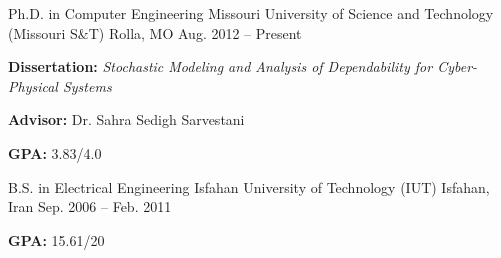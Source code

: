 \begin{cventries}
  \cventry
    {Ph.D. in Computer Engineering}
    {Missouri University of Science and Technology (Missouri S\&T)}
    {Rolla, MO}
    {Aug. 2012 -- Present}
    {
      \begin{cvitems}
        \item \textbf{Dissertation:} \emph{Stochastic Modeling and Analysis of Dependability for Cyber-Physical Systems}
        \item \textbf{Advisor:} Dr. Sahra Sedigh Sarvestani
        \item \textbf{GPA:} 3.83/4.0
      \end{cvitems}
    }
  \cventry
    {B.S. in Electrical Engineering}
    {Isfahan University of Technology (IUT)}
    {Isfahan, Iran}
    {Sep. 2006 -- Feb. 2011}
    {
      \begin{cvitems}
        \item \textbf{GPA:} 15.61/20
      \end{cvitems}
    }
\end{cventries}